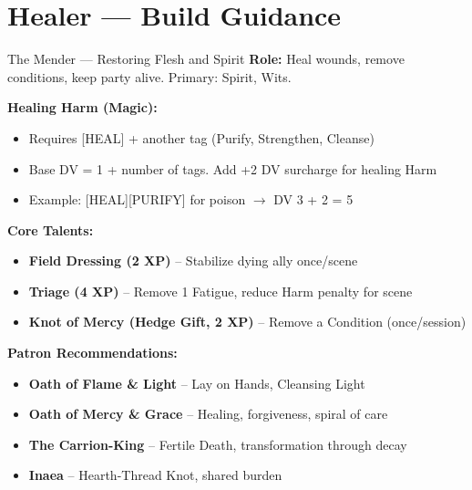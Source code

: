 \documentclass[10pt]{article}
\begin{document}
\newpage


\section*{Healer --- Build Guidance}

\begin{tipbox}{The Mender --- Restoring Flesh and Spirit}
    \textbf{Role:} Heal wounds, remove conditions, keep party alive. Primary: Spirit, Wits.
    
    \textbf{Healing Harm (Magic):}
    \begin{itemize}
        \item Requires [HEAL] + another tag (Purify, Strengthen, Cleanse)
        \item Base DV = 1 + number of tags. Add +2 DV surcharge for healing Harm
        \item Example: [HEAL][PURIFY] for poison $\rightarrow$ DV 3 + 2 = 5
    \end{itemize}
    
    \textbf{Core Talents:}
    \begin{itemize}
        \item \textbf{Field Dressing (2 XP)} -- Stabilize dying ally once/scene
        \item \textbf{Triage (4 XP)} -- Remove 1 Fatigue, reduce Harm penalty for scene
        \item \textbf{Knot of Mercy (Hedge Gift, 2 XP)} -- Remove a Condition (once/session)
    \end{itemize}
    
    \textbf{Patron Recommendations:}
    \begin{itemize}
        \item \textbf{Oath of Flame \& Light} -- Lay on Hands, Cleansing Light
        \item \textbf{Oath of Mercy \& Grace} -- Healing, forgiveness, spiral of care
        \item \textbf{The Carrion-King} -- Fertile Death, transformation through decay
        \item \textbf{Inaea} -- Hearth-Thread Knot, shared burden
    \end{itemize}
\end{tipbox}
\end{document}
